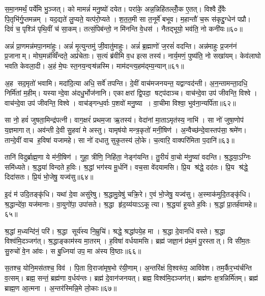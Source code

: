 स॒मा॒नमर्थं॒ पर्ये॑मि भु॒ञ्जत्। को मामन्नं॑ मनु॒ष्यो॑ दयेत। परा॑के॒ अन्न॒न्निहि॑तल्लोँ॒क ए॒तत्। विश्वैर्दे॒वैः पि॒तृभि॑र्गु॒प्तमन्नम्। यद॒द्यते॑ लु॒प्यते॒ यत्प॑रो॒प्यते। श॒त॒त॒मी सा त॒नूर्मे॑ बभूव। म॒हान्तौ॑ च॒रू स॑कृद्दु॒ग्धेन॑ पप्रौ। दिवं॑ च॒ पृश्ञि॑ पृथि॒वीं च॑ सा॒कम्। तत्सं॒पिब॑न्तो॒ न मि॑नन्ति वे॒धस॑। नैतद्भूयो॒ भव॑ति॒ नो कनी॑यः॥६०॥

अन्नं॑ प्रा॒णमन्न॑मपा॒नमा॑हुः। अन्नं॑ मृ॒त्युन्तमु॑ जी॒वातु॑माहुः। अन्नं॑ ब्र॒ह्माणो॑ ज॒रसं॑  वदन्ति। अन्न॑माहुः प्र॒जन॑नं प्र॒जानाम्। मोघ॒मन्न॑व्विँन्दते॒ अप्र॑चेताः। स॒त्यं ब्र॑वीमि व॒ध इत्स तस्य॑। नार्य॒मणं॒ पुष्य॑ति॒ नो सखा॑यम्। केव॑लाघो भवति केवला॒दी। अ॒हं मे॒घः स्त॒नय॒न्वऱ़्ष॑न्नस्मि। माम॑दन्त्य॒हम॑द्म्य॒न्यान्॥६१॥

अ॒ह सद॒मृतो॑ भवामि। मदा॑दि॒त्या अधि॒ सर्वे॑ तपन्ति। दे॒वीं वाच॑मजनयन्त॒ यद्वाग्वद॑न्ती। अ॒न॒न्तामन्ता॒दधि॒ निर्मि॑तां म॒हीम्। यस्यान्दे॒वा अ॑दधु॒र्भोज॑नानि। एकाक्षरां द्वि॒पदा॒ षट्प॑दाञ्च। वाच॑न्दे॒वा उप॑ जीवन्ति॒ विश्वे। वाच॑न्दे॒वा उप॑ जीवन्ति॒ विश्वे। वाच॑ङ्गन्ध॒र्वाः प॒शवो॑ मनु॒ष्या। वा॒चीमा विश्वा॒ भुव॑ना॒न्यर्पि॑ता॥६२॥

सा नो॒ हवं॑ जुषता॒मिन्द्र॑पत्नी। वाग॒क्षरं॑ प्रथम॒जा ऋ॒तस्य॑। वेदा॑नां मा॒ताऽमृत॑स्य॒ नाभि॑। सा नो॑ जुषा॒णोप॑ य॒ज्ञमागात्। अव॑न्ती दे॒वी सु॒हवा॑ मे अस्तु। यामृष॑यो मन्त्र॒कृतो॑ मनी॒षिण॑। अ॒न्वैच्छ॑न्दे॒वास्तप॑सा॒ श्रमे॑ण। तान्दे॒वीं वाच ह॒विषा॑ यजामहे। सा नो॑ दधातु सुकृ॒तस्य॑ लो॒के। च॒त्वारि॒ वाक्परि॑मिता प॒दानि॑॥६३॥

तानि॑ विदुर्ब्राह्म॒णा ये म॑नी॒षिण॑। गुहा॒ त्रीणि॒ निहि॑ता॒ नेङ्ग॑यन्ति। तु॒रीयं॑ वा॒चो म॑नु॒ष्या॑ वदन्ति। श्र॒द्धया॒ऽग्निः समि॑ध्यते। श्र॒द्धया॑ विन्दते ह॒विः। श्र॒द्धां भग॑स्य मू॒र्धनि॑। वच॒सा वे॑दयामसि। प्रि॒य श्र॑द्धे॒ दद॑तः। प्रि॒य श्र॑द्धे॒ दिदा॑सतः। प्रि॒यं भो॒जेषु॒ यज्व॑सु॥६४॥

इ॒दं म॑ उदि॒तङ्कृ॑धि। यथा॑ दे॒वा असु॑रेषु। श्र॒द्धामु॒ग्रेषु॑ चक्रि॒रे। ए॒वं भो॒जेषु॒ यज्व॑सु। अ॒स्माक॑मुदि॒तङ्कृ॑धि। श्र॒द्धान्दे॑वा॒ यज॑मानाः। वा॒युगो॑पा॒ उपा॑सते। श्र॒द्धा हृ॑द॒य्य॑याऽऽकूत्या। श्र॒द्धया॑ हूयते ह॒विः। श्र॒द्धां प्रा॒तर्\mbox{}ह॑वामहे॥६५॥

श्र॒द्धां म॒ध्यन्दि॑नं॒ परि॑। श्र॒द्धा सूर्य॑स्य नि॒म्रुचि॑। श्रद्धे॒ श्रद्धा॑पये॒ह मा। श्र॒द्धा दे॒वानधि॑ वस्ते। श्र॒द्धा विश्व॑मि॒दञ्जग॑त्। श्र॒द्धाङ्काम॑स्य मा॒तरम्। ह॒विषा॑ वर्धयामसि। ब्रह्म॑ जज्ञा॒नं प्र॑थ॒मं पु॒रस्तात्। वि सी॑म॒तः सु॒रुचो॑ वे॒न आ॑वः। स बु॒ध्निया॑ उप॒ मा अ॑स्य वि॒ष्ठाः॥६६॥

स॒तश्च॒ योनि॒मस॑तश्च॒ विव॑। पि॒ता वि॒राजा॑मृष॒भो र॑यी॒णाम्। अ॒न्तरि॑क्षं वि॒श्वरू॑प॒ आवि॑वेश। तम॒र्कैर॒भ्य॑र्चन्ति व॒त्सम्। ब्रह्म॒ सन्तं॒ ब्रह्म॑णा व॒र्धय॑न्तः। ब्रह्म॑ दे॒वान॑जनयत्। ब्रह्म॒ विश्व॑मि॒दञ्जग॑त्। ब्रह्म॑णः क्ष॒त्रन्निर्मि॑तम्। ब्रह्म॑ ब्राह्म॒ण आ॒त्मना। अ॒न्तर॑स्मिन्नि॒मे लो॒काः॥६७॥

